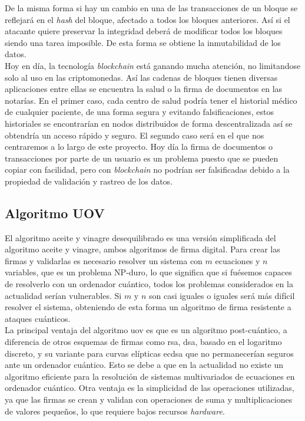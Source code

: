 De la misma forma si hay un cambio en una de las transacciones de un bloque se reflejará en el \textit{hash} del bloque, afectado a todos los bloques anteriores. Así si el atacante quiere preservar la integridad deberá de modificar todos los bloques siendo una tarea imposible. De esta forma se obtiene la inmutabilidad de los datos.\\

Hoy en día, la tecnología \textit{blockchain} está ganando mucha atención, no limitandose solo al uso en las criptomonedas. Así las cadenas de bloques tienen diversas aplicaciones entre ellas se encuentra la salud o la firma de documentos en las notarías. En el primer caso, cada centro  de salud podría tener el historial médico de cualquier paciente, de una forma segura y evitando falsificaciones, estos historiales se encontrarían en nodos distribuidos de forma descentralizada así se obtendría un acceso rápido y seguro. El segundo caso será en el que nos centraremos a lo largo de este proyecto. Hoy día la firma de documentos o transacciones por parte de un usuario es un problema puesto que se pueden copiar con facilidad, pero con \textit{blockchain} no podrían ser falsificadas debido a la propiedad de validación y rastreo de los datos.\\


\subsection{Algoritmo UOV}\label{sec:intro:UOV}

El algoritmo aceite y vinagre desequilibrado es una versión simplificada del algoritmo aceite y vinagre, ambos algoritmos de firma digital. Para crear las firmas y validarlas es necesario resolver un sistema con $m$ ecuaciones y $n$ variables, que es un problema NP-duro, lo que significa que si fuésemos capaces de resolverlo con un ordenador cuántico, todos los problemas considerados en la actualidad serían vulnerables. Si $m$ y $n$ son casi iguales o iguales será más difícil resolver el sistema, obteniendo de esta forma un algoritmo de firma resistente a ataques cuánticos.\\

La principal ventaja del algoritmo \acrshort{uov} es que es un algoritmo post-cuántico, a diferencia de otros esquemas de firmas como \acrshort{rsa}, \acrshort{dsa}, basado en el logaritmo discreto, y su variante para curvas elípticas \mbox{\acrshort{ecdsa}} que no permanecerían seguros ante un ordenador cuántico. Esto se debe a que en la actualidad no existe un algoritmo eficiente para la resolución de sistemas multivariados de ecuaciones  en ordenador cuántico. Otra ventaja es la simplicidad de las operaciones utilizadas, ya que las firmas se crean y validan con operaciones de suma y multiplicaciones de valores pequeños, lo que requiere bajos recursos \textit{hardware}. 

